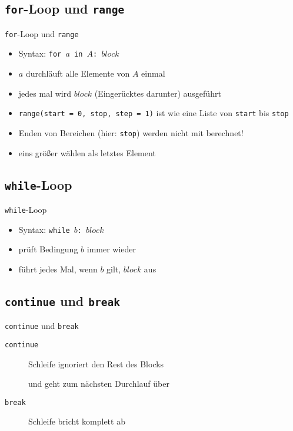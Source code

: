 \subsection{\texttt{for}-Loop und \texttt{range}}
\begin{frame}{\texttt{for}-Loop und \texttt{range}}
	\begin{itemize}
		\item Syntax: \texttt{for $a$ in $A$: $block$}
		\item $a$ durchläuft alle Elemente von $A$ einmal
		\item jedes mal wird $block$ (Eingerücktes darunter) ausgeführt
		\item \texttt{range(start = 0, stop, step = 1)} ist wie eine Liste von \texttt{start} bis \texttt{stop}
		\item Enden von Bereichen (hier: \texttt{stop}) werden nicht mit berechnet!
		\item eins größer wählen als letztes Element
	\end{itemize}
	
\end{frame}

\subsection{\texttt{while}-Loop}
\begin{frame}{\texttt{while}-Loop}
	\begin{itemize}
		\item Syntax: \texttt{while $b$: $block$}
		\item prüft Bedingung $b$ immer wieder
		\item führt jedes Mal, wenn $b$ gilt, $block$ aus
	\end{itemize}
	
\end{frame}

\subsection{\texttt{continue} und \texttt{break}}
\begin{frame}{\texttt{continue} und \texttt{break}}
	\begin{description}
		\item[\texttt{continue}] Schleife ignoriert den Rest des Blocks
		\item[]	und geht zum nächsten Durchlauf über
		\item[\texttt{break}] Schleife bricht komplett ab
	\end{description}
\end{frame}

